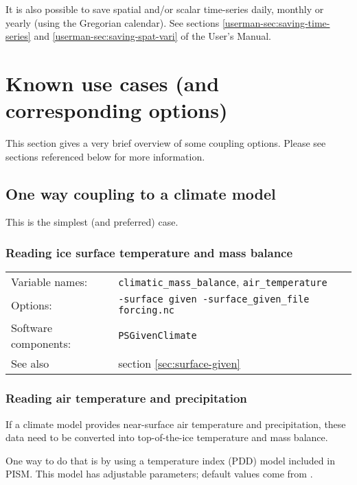 \documentclass[titlepage,letterpaper,final]{scrartcl}
\begin{document}
It is also possible to save spatial and/or scalar time-series daily, monthly or
yearly (using the Gregorian calendar). See sections \ref*{userman-sec:saving-time-series}
and \ref*{userman-sec:saving-spat-vari} of the User's Manual.

\section{Known use cases (and corresponding options)}
\label{sec:known-use-cases}

This section gives a very brief overview of some coupling options. Please see sections referenced below for more information.

\subsection{One way coupling to a climate model}
\label{sec:one-way-coupling}
This is the simplest (and preferred) case.

\subsubsection{Reading ice surface temperature and mass balance}
\label{sec:ice-surface-bc}
\begin{center}
  \begin{tabular}{lp{}}
    \toprule
    Variable names: & \texttt{climatic_mass_balance}, \texttt{air_temperature} \\
    Options: & \texttt{-surface given -surface_given_file forcing.nc} \\
    Software components: & \texttt{PSGivenClimate} \\
    See also & section \ref{sec:surface-given} \\
    \bottomrule
  \end{tabular}
\end{center}

\subsubsection{Reading air temperature and precipitation}
\label{sec:air-temp-and-precip}

If a climate model provides near-surface air temperature and precipitation, these data need to be converted into top-of-the-ice temperature and mass balance.

One way to do that is by using a temperature index (PDD) model included in PISM. This model has adjustable parameters; default values come from \cite{RitzEISMINT}.
\end{document}
